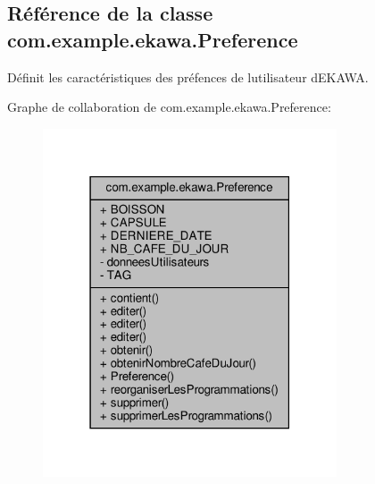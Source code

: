 \hypertarget{classcom_1_1example_1_1ekawa_1_1_preference}{}\subsection{Référence de la classe com.\+example.\+ekawa.\+Preference}
\label{classcom_1_1example_1_1ekawa_1_1_preference}


Définit les caractéristiques des préfences de l\textquotesingle{}utilisateur d\textquotesingle{}E\+K\+A\+WA.  




Graphe de collaboration de com.\+example.\+ekawa.\+Preference\+:\nopagebreak
\begin{figure}[H]
\begin{center}
\leavevmode
\includegraphics[width=247pt]{classcom_1_1example_1_1ekawa_1_1_preference__coll__graph}
\end{center}
\end{figure}

